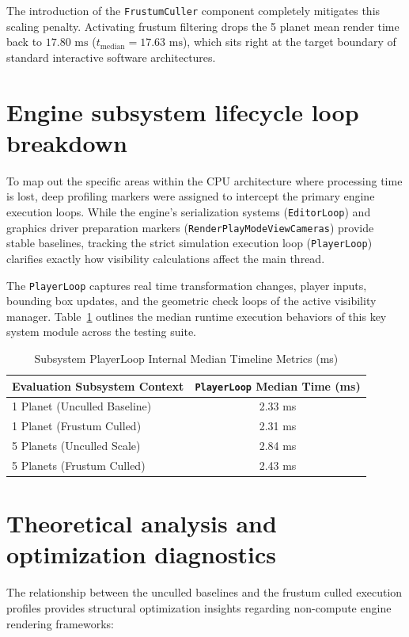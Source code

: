 \documentclass[12pt]{report}
\begin{document}
The introduction of the \texttt{FrustumCuller} component completely mitigates this scaling penalty. Activating frustum filtering drops the 5 planet mean render time back to $17.80\text{ ms}$ ($t_{\text{median}} = 17.63\text{ ms}$), which sits right at the target boundary of standard interactive software architectures.

\section{Engine subsystem lifecycle loop breakdown}
To map out the specific areas within the CPU architecture where processing time is lost, deep profiling markers were assigned to intercept the primary engine execution loops. While the engine's serialization systems (\texttt{EditorLoop}) and graphics driver preparation markers (\texttt{RenderPlayModeViewCameras}) provide stable baselines, tracking the strict simulation execution loop (\texttt{PlayerLoop}) clarifies exactly how visibility calculations affect the main thread.

The \texttt{PlayerLoop} captures real time transformation changes, player inputs, bounding box updates, and the geometric check loops of the active visibility manager. Table~\ref{tab:player_loop_analysis} outlines the median runtime execution behaviors of this key system module across the testing suite.

\begin{table}[htbp]
    \centering
    \caption{Subsystem PlayerLoop Internal Median Timeline Metrics (ms)}
    \label{tab:player_loop_analysis}
    \vspace{0.5em}
    \begin{tabular}{lc}
        \hline
        \textbf{Evaluation Subsystem Context} & \textbf{\texttt{PlayerLoop} Median Time (ms)} \\ \hline
        1 Planet (Unculled Baseline)           & 2.33 ms \\ 
        1 Planet (Frustum Culled)              & 2.31 ms \\ 
        5 Planets (Unculled Scale)             & 2.84 ms \\ 
        5 Planets (Frustum Culled)             & 2.43 ms \\ \hline
    \end{tabular}
\end{table}

\section{Theoretical analysis and optimization diagnostics}
The relationship between the unculled baselines and the frustum culled execution profiles provides structural optimization insights regarding non-compute engine rendering frameworks:
\end{document}
